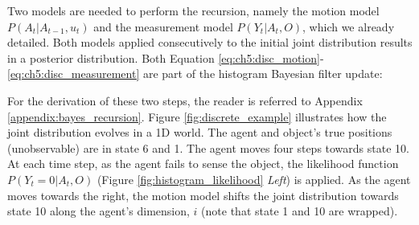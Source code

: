 Two models are needed to perform the recursion, namely the motion model $P(A_t|A_{t-1},u_t)$ and the measurement model
$P(Y_t|A_t,O)$, which we already detailed. Both models applied consecutively to the initial joint distribution results in a posterior
distribution. Both Equation \ref{eq:ch5:disc_motion}-\ref{eq:ch5:disc_measurement} are part of the histogram Bayesian filter 
update:

\begin{center}
%
\end{center}

For the derivation of these  two steps, the reader is referred to Appendix \ref{appendix:bayes_recursion}.
Figure \ref{fig:discrete_example} illustrates how the joint distribution evolves in a 1D world. 
The agent and object's true positions (unobservable) are in state 6 and 1. The agent moves four steps towards state 10. At each time 
step, as the agent fails to sense the object, the likelihood function  $P(Y_t=0|A_t,O)$ (Figure \ref{fig:histogram_likelihood} \textit{Left})
is applied. As the agent moves towards the right, the motion model shifts the joint distribution towards state 10 along the agent's 
dimension, $i$ (note that state 1 and 10 are wrapped).


